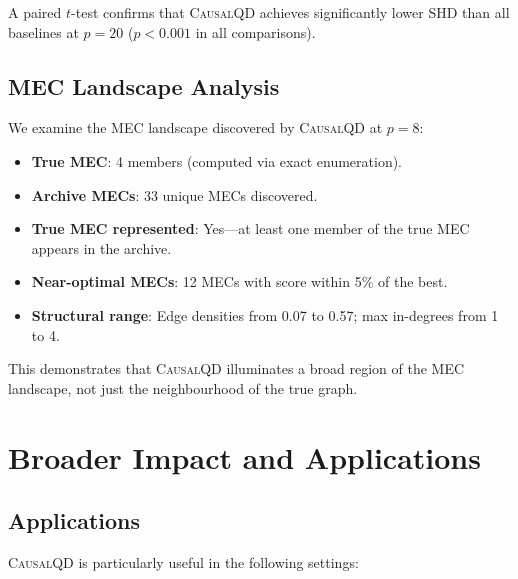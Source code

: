 \documentclass[11pt,a4paper]{article}
\begin{document}
A paired $t$-test confirms that \textsc{CausalQD} achieves significantly lower SHD than all baselines at $p = 20$ ($p < 0.001$ in all comparisons).

\subsection{MEC Landscape Analysis}

We examine the MEC landscape discovered by \textsc{CausalQD} at $p = 8$:

\begin{itemize}[leftmargin=*]
    \item \textbf{True MEC}: 4 members (computed via exact enumeration).
    \item \textbf{Archive MECs}: 33 unique MECs discovered.
    \item \textbf{True MEC represented}: Yes---at least one member of the true MEC appears in the archive.
    \item \textbf{Near-optimal MECs}: 12 MECs with score within 5\% of the best.
    \item \textbf{Structural range}: Edge densities from 0.07 to 0.57; max in-degrees from 1 to 4.
\end{itemize}

This demonstrates that \textsc{CausalQD} illuminates a broad region of the MEC landscape, not just the neighbourhood of the true graph.

\section{Broader Impact and Applications}
\label{app:impact}

\subsection{Applications}

\textsc{CausalQD} is particularly useful in the following settings:
\end{document}
